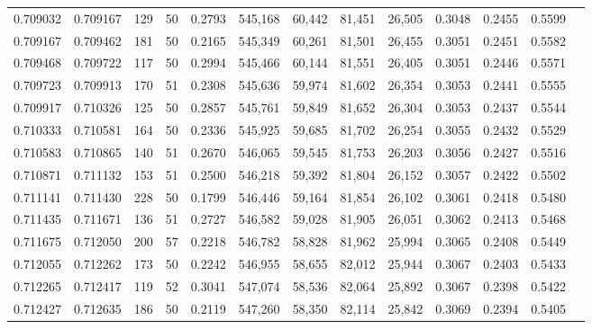 \begin{tabular}{rrrrrrrrrrrrr}
0.709032 & 0.709167 &   129 &  50 &                                     0.2793 & 545,168 &  60,442 &  81,451 &  26,505 & 0.3048 & 0.2455 & 0.5599 \\
0.709167 & 0.709462 &   181 &  50 &                                     0.2165 & 545,349 &  60,261 &  81,501 &  26,455 & 0.3051 & 0.2451 & 0.5582 \\
0.709468 & 0.709722 &   117 &  50 &                                     0.2994 & 545,466 &  60,144 &  81,551 &  26,405 & 0.3051 & 0.2446 & 0.5571 \\
0.709723 & 0.709913 &   170 &  51 &                                     0.2308 & 545,636 &  59,974 &  81,602 &  26,354 & 0.3053 & 0.2441 & 0.5555 \\
0.709917 & 0.710326 &   125 &  50 &                                     0.2857 & 545,761 &  59,849 &  81,652 &  26,304 & 0.3053 & 0.2437 & 0.5544 \\
0.710333 & 0.710581 &   164 &  50 &                                     0.2336 & 545,925 &  59,685 &  81,702 &  26,254 & 0.3055 & 0.2432 & 0.5529 \\
0.710583 & 0.710865 &   140 &  51 &                                     0.2670 & 546,065 &  59,545 &  81,753 &  26,203 & 0.3056 & 0.2427 & 0.5516 \\
0.710871 & 0.711132 &   153 &  51 &                                     0.2500 & 546,218 &  59,392 &  81,804 &  26,152 & 0.3057 & 0.2422 & 0.5502 \\
0.711141 & 0.711430 &   228 &  50 &                                     0.1799 & 546,446 &  59,164 &  81,854 &  26,102 & 0.3061 & 0.2418 & 0.5480 \\
0.711435 & 0.711671 &   136 &  51 &                                     0.2727 & 546,582 &  59,028 &  81,905 &  26,051 & 0.3062 & 0.2413 & 0.5468 \\
0.711675 & 0.712050 &   200 &  57 &                                     0.2218 & 546,782 &  58,828 &  81,962 &  25,994 & 0.3065 & 0.2408 & 0.5449 \\
0.712055 & 0.712262 &   173 &  50 &                                     0.2242 & 546,955 &  58,655 &  82,012 &  25,944 & 0.3067 & 0.2403 & 0.5433 \\
0.712265 & 0.712417 &   119 &  52 &                                     0.3041 & 547,074 &  58,536 &  82,064 &  25,892 & 0.3067 & 0.2398 & 0.5422 \\
0.712427 & 0.712635 &   186 &  50 &                                     0.2119 & 547,260 &  58,350 &  82,114 &  25,842 & 0.3069 & 0.2394 & 0.5405 \\

\end{tabular}
